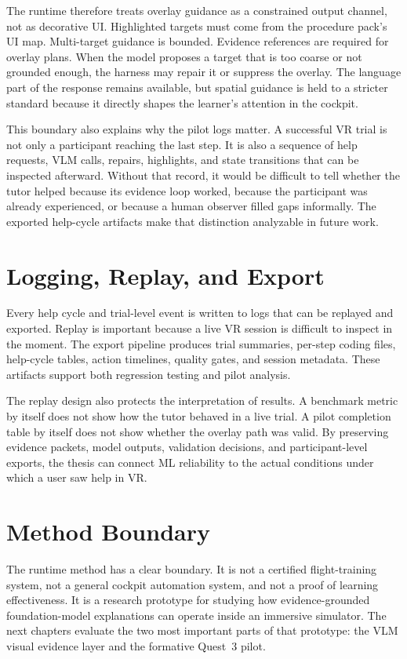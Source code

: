 The runtime therefore treats overlay guidance as a constrained output channel,
not as decorative UI. Highlighted targets must come from the procedure pack's
UI map. Multi-target guidance is bounded. Evidence references are required for
overlay plans. When the model proposes a target that is too coarse or not
grounded enough, the harness may repair it or suppress the overlay. The
language part of the response remains available, but spatial guidance is held
to a stricter standard because it directly shapes the learner's attention in
the cockpit.

This boundary also explains why the pilot logs matter. A successful VR trial is
not only a participant reaching the last step. It is also a sequence of help
requests, VLM calls, repairs, highlights, and state transitions that can be
inspected afterward. Without that record, it would be difficult to tell whether
the tutor helped because its evidence loop worked, because the participant was
already experienced, or because a human observer filled gaps informally. The
exported help-cycle artifacts make that distinction analyzable in future work.

\section{Logging, Replay, and Export}\label{sec:design-replay}

Every help cycle and trial-level event is written to logs that can be replayed
and exported. Replay is important because a live VR session is difficult to
inspect in the moment. The export pipeline produces trial summaries,
per-step coding files, help-cycle tables, action timelines, quality gates, and
session metadata. These artifacts support both regression testing and pilot
analysis.

The replay design also protects the interpretation of results. A benchmark
metric by itself does not show how the tutor behaved in a live trial. A pilot
completion table by itself does not show whether the overlay path was valid.
By preserving evidence packets, model outputs, validation decisions, and
participant-level exports, the thesis can connect ML reliability to the actual
conditions under which a user saw help in VR.

\section{Method Boundary}\label{sec:design-boundary}

The runtime method has a clear boundary. It is not a certified flight-training
system, not a general cockpit automation system, and not a proof of learning
effectiveness. It is a research prototype for studying how evidence-grounded
foundation-model explanations can operate inside an immersive simulator. The
next chapters evaluate the two most important parts of that prototype: the VLM
visual evidence layer and the formative Quest~3 pilot.
